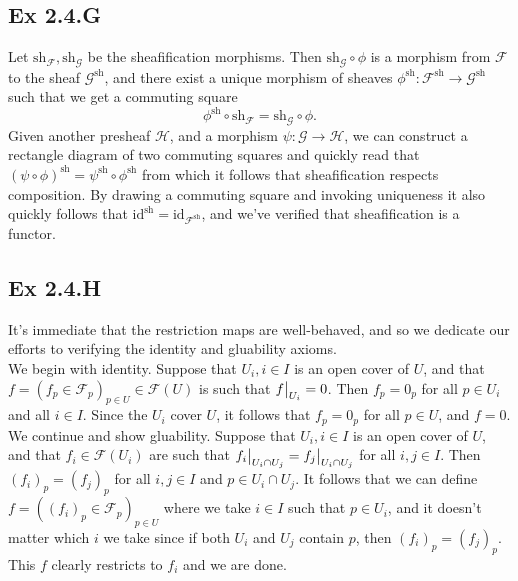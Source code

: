 \documentclass{article}
\newcommand\restr[2]{{%
  \left.\kern-\nulldelimiterspace %
  #1 %
  \vphantom{\big|} %
  \right|_{#2} %
  }}
\theoremstyle{definition}
\newcommand{\id}{\text{id}}
\begin{document}
\subsection*{Ex 2.4.G}

Let $\text{sh}_\mathcal{F}, \text{sh}_{\mathcal{G}}$ be the sheafification
morphisms. Then $\text{sh}_{\mathcal{G}} \circ \phi$ is a morphism from
$\mathcal{F}$ to the sheaf $\mathcal{G}^{\text{sh}}$, and there exist a unique
morphism of sheaves $\phi^{\text{sh}} : \mathcal{F}^{\text{sh}} \to
\mathcal{G}^{\text{sh}}$ such that we get a commuting square
\[
	\phi^{\text{sh}} \circ \text{sh}_{\mathcal{F}}
	=
	\text{sh}_{\mathcal{G}} \circ \phi.
\]
Given another presheaf $\mathcal{H}$, and a morphism $\psi : \mathcal{G} \to
\mathcal{H}$, we can construct a rectangle diagram of two commuting squares and
quickly read that $(\psi \circ \phi)^{\text{sh}} = \psi^{\text{sh}} \circ
\phi^{\text{sh}}$ from which it follows that sheafification respects
composition. By drawing a commuting square and invoking uniqueness it also
quickly follows that $\id^{\text{sh}} = \id_{\mathcal{F}^{\text{sh}}}$, and
we've verified that sheafification is a functor.

\subsection*{Ex 2.4.H}

It's immediate that the restriction maps are well-behaved, and so we dedicate
our efforts to verifying the identity and gluability axioms. \\

We begin with identity. Suppose that $U_i, i \in I$ is an open cover of $U$,
and that $f = (f_p \in \mathcal{F}_p)_{p \in U} \in \mathcal{F}(U)$ is such
that $\restr{f}{U_i} = 0$. Then $f_p = 0_p$ for all $p \in U_i$ and all $i \in
I$. Since the $U_i$ cover $U$, it follows that $f_p = 0_p$ for all $p \in U$,
and $f = 0$. \\

We continue and show gluability. Suppose that $U_i, i \in I$ is an open cover
of $U$, and that $f_i \in \mathcal{F}(U_i)$ are such that $\restr{f_i}{U_i \cap
U_j} = \restr{f_j}{U_i \cap U_j}$ for all $i, j \in I$. Then $(f_i)_p =
(f_j)_p$ for all $i, j \in I$ and $p \in U_i \cap U_j$. It follows that we can
define $f = ((f_i)_p \in \mathcal{F}_p)_{p \in U}$ where we take $i \in I$ such
that $p \in U_i$, and it doesn't matter which $i$ we take since if both $U_i$
and $U_j$ contain $p$, then $(f_i)_p = (f_j)_p$. This $f$ clearly restricts to
$f_i$ and we are done.
\end{document}
